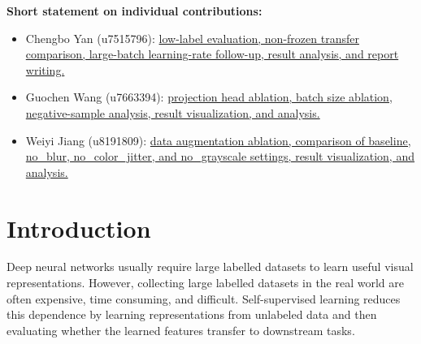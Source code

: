 \documentclass[10pt]{article}
\begin{document}
\textbf{Short statement on individual contributions:}
\begin{itemize}[leftmargin=1.5em, noitemsep, topsep=0pt]
    \item Chengbo Yan (u7515796): \uline{low-label evaluation, non-frozen transfer comparison, large-batch learning-rate follow-up, result analysis, and report writing.}
    \item Guochen Wang (u7663394): \uline{projection head ablation, batch size ablation, negative-sample analysis, result visualization, and analysis.}
    \item Weiyi Jiang (u8191809): \uline{data augmentation ablation, comparison of baseline, no\_blur, no\_color\_jitter, and no\_grayscale settings, result visualization, and analysis.}
\end{itemize}

\vspace{1em}

\begin{abstract}
Self-supervised learning can reduce the need for labelled data by learning visual representations from unlabeled images. This report studies SimCLR on CIFAR-10 with a ResNet-18 backbone as encoder and analyses which components are most important for downstream representation quality. We run controlled ablations on data augmentation, projection head, batch size, and low-label evaluation, using frozen linear evaluation as the main metric. Our results show that ColorJitter is the most important augmentation in our setting, since removing it reduces linear evaluation accuracy from 68.20\% to 62.61\%. The projection head improves best accuracy from 62.16\% to 63.59\%. Batch size 256 performs best under the default training setup, but a learning-rate follow-up shows that batch size 1024 can recover from 57.56\% to 65.43\% when the learning rate is increased. Low-label experiments show that SimCLR mainly improves label efficiency. Overall, our experiments show that SimCLR performance depends on both representation design and optimization details.
\end{abstract}

\newpage
\section{Introduction}

Deep neural networks usually require large labelled datasets to learn useful visual representations. However, collecting large labelled datasets in the real world are often expensive, time consuming, and difficult. Self-supervised learning reduces this dependence by learning representations from unlabeled data and then evaluating whether the learned features transfer to downstream tasks.
\end{document}
